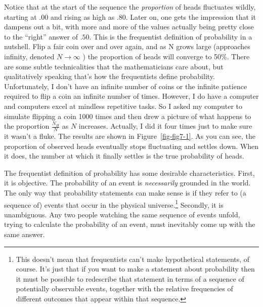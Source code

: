 \documentclass[
  letterpaper,
]{book}
\begin{document}
Notice that at the start of the sequence the \emph{proportion} of heads
fluctuates wildly, starting at \(.00\) and rising as high as \(.80\).
Later on, one gets the impression that it dampens out a bit, with more
and more of the values actually being pretty close to the ``right''
answer of \(.50\). This is the frequentist definition of probability in
a nutshell. Flip a fair coin over and over again, and as N grows large
(approaches infinity, denoted \(N \rightarrow \infty\) ) the proportion
of heads will converge to 50\%. There are some subtle technicalities
that the mathematicians care about, but qualitatively speaking that's
how the frequentists define probability. Unfortunately, I don't have an
infinite number of coins or the infinite patience required to flip a
coin an infinite number of times. However, I do have a computer and
computers excel at mindless repetitive tasks. So I asked my computer to
simulate flipping a coin 1000 times and then drew a picture of what
happens to the proportion \(\frac{N_H}{N}\) as \(N\) increases.
Actually, I did it four times just to make sure it wasn't a fluke. The
results are shown in Figure~\ref{fig-fig7-1}. As you can see, the
proportion of observed heads eventually stops fluctuating and settles
down. When it does, the number at which it finally settles is the true
probability of heads.

The frequentist definition of probability has some desirable
characteristics. First, it is objective. The probability of an event is
\emph{necessarily} grounded in the world. The only way that probability
statements can make sense is if they refer to (a sequence of) events
that occur in the physical universe.\footnote{This doesn't mean that
  frequentists can't make hypothetical statements, of course. It's just
  that if you want to make a statement about probability then it must be
  possible to redescribe that statement in terms of a sequence of
  potentially observable events, together with the relative frequencies
  of different outcomes that appear within that sequence.} Secondly, it
is unambiguous. Any two people watching the same sequence of events
unfold, trying to calculate the probability of an event, must inevitably
come up with the same answer.
\end{document}
